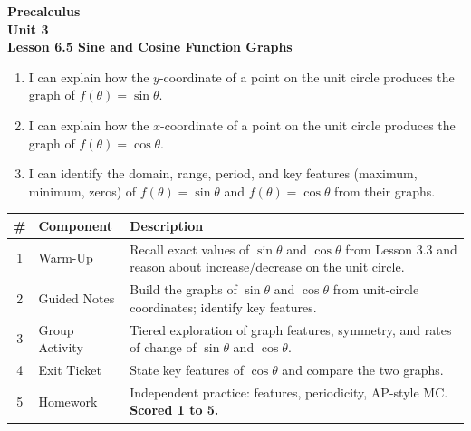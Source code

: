 \documentclass[10pt]{article}
\begin{document}
\vspace{-0.8in}

\begin{center}
  {\color{white}\textbf{\LARGE Precalculus}}\\[4pt]
  {\color{skymid}\large\textbf{Unit 3}}\\[6pt]
  {\color{white}\textbf{\large Lesson 6.5 \quad Sine and Cosine Function Graphs}}
\end{center}

\vspace{0.22in}
\namedateperiod
\vspace{0.18in}

\begin{learningtargetbox}
\small
\begin{enumerate}[leftmargin=1.5em, itemsep=6pt]
  \item I can explain how the $y$-coordinate of a point on the unit circle produces the
        graph of $f(\theta)=\sin\theta$.
  \item I can explain how the $x$-coordinate of a point on the unit circle produces the
        graph of $f(\theta)=\cos\theta$.
  \item I can identify the domain, range, period, and key features (maximum, minimum, zeros)
        of $f(\theta)=\sin\theta$ and $f(\theta)=\cos\theta$ from their graphs.
\end{enumerate}
\end{learningtargetbox}

\vspace{0.14in}

\begin{tocbox}
\small
\renewcommand{\arraystretch}{1.5}
\begin{tabularx}{\linewidth}{@{} c l X @{}}
\rowcolor{sky}
\textbf{\#} & \textbf{Component} & \textbf{Description} \\
\midrule
1 & Warm-Up        & Recall exact values of $\sin\theta$ and $\cos\theta$ from Lesson 3.3
                     and reason about increase/decrease on the unit circle. \\
2 & Guided Notes   & Build the graphs of $\sin\theta$ and $\cos\theta$ from unit-circle
                     coordinates; identify key features. \\
3 & Group Activity & Tiered exploration of graph features, symmetry, and rates of change
                     of $\sin\theta$ and $\cos\theta$. \\
4 & Exit Ticket    & State key features of $\cos\theta$ and compare the two graphs. \\
5 & Homework       & Independent practice: features, periodicity, AP-style MC. \textbf{Scored 1 to 5.} \\
\end{tabularx}
\end{tocbox}
\end{document}
